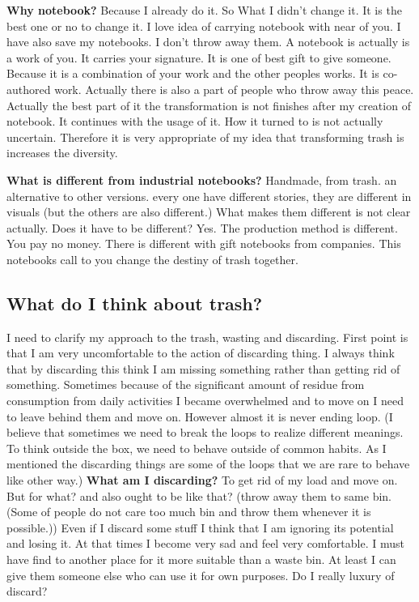 \textbf{Why notebook?} Because I already do it. So What I didn't change it. It is the best one or no to change it. I love idea of carrying notebook with near of you. I have also save my notebooks. I don't throw away them. A notebook is actually is a work of you. It carries your signature. It is one of best gift to give someone. Because it is a combination of your work and the other peoples works. It is co-authored work. Actually there is also a part of people who throw away this peace. Actually the best part of it the transformation is not finishes after my creation of notebook. It continues with the usage of it. How it turned to is not actually uncertain. Therefore it is very appropriate of my idea that transforming trash is increases the diversity.

\textbf{What is different from industrial notebooks?} Handmade, from trash. an alternative to other versions. every one have different stories, they are different in visuals (but the others are also different.) What makes them different is not clear actually. Does it have to be different? Yes. The production method is different. You pay no money. There is different with gift notebooks from companies. This notebooks call to you change the destiny of trash together. 

\subsection{What do I think about trash?}
I need to clarify my approach to the trash, wasting and discarding. First point is that I am very uncomfortable to the action of discarding thing. I always think that by discarding this think I am missing something rather than getting rid of something. Sometimes because of the significant amount of residue from consumption from daily activities I became overwhelmed and to move on I need to leave behind them and move on. However almost it is never ending loop. (I believe that sometimes we need to break the loops to realize different meanings. To think outside the box, we need to behave outside of common habits. As I mentioned the discarding things are some of the loops that we are rare to behave like other way.) \textbf{What am I discarding?} To get rid of my load and move on. But for what? and also ought to be like that? (throw away them to same bin. (Some of people do not care too much bin and throw them whenever it is possible.)) Even if I discard some stuff I think that I am ignoring its potential and losing it. At that times I become very sad and feel very comfortable. I must have find to another place for it more suitable than a waste bin. At least I can give them someone else who can use it for own purposes. Do I really luxury of discard?

